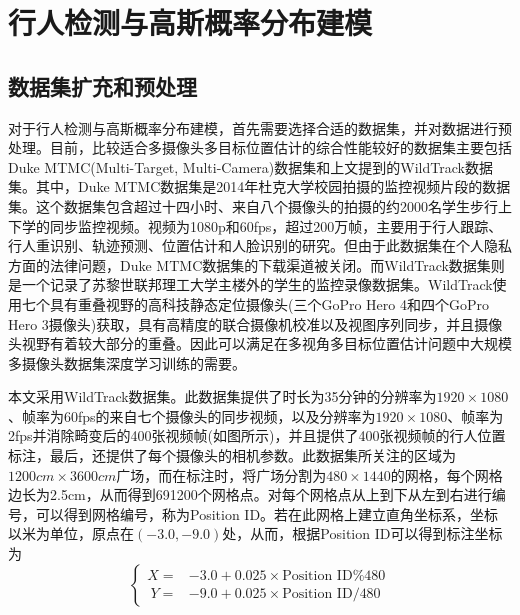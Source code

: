 
\chapter{行人检测与高斯概率分布建模}

\section{数据集扩充和预处理}

对于行人检测与高斯概率分布建模，首先需要选择合适的数据集，并对数据进行预处理。目前，比较适合多摄像头多目标位置估计的综合性能较好的数据集主要包括Duke MTMC(Multi-Target, Multi-Camera)数据集\cite{Ristani2016PerformanceMA}和上文提到的WildTrack数据集。其中，Duke MTMC数据集是2014年杜克大学校园拍摄的监控视频片段的数据集。这个数据集包含超过十四小时、来自八个摄像头的拍摄的约2000名学生步行上下学的同步监控视频。视频为1080p和60fps，超过200万帧，主要用于行人跟踪、行人重识别、轨迹预测、位置估计和人脸识别的研究。但由于此数据集在个人隐私方面的法律问题，Duke MTMC数据集的下载渠道被关闭。而WildTrack数据集则是一个记录了苏黎世联邦理工大学主楼外的学生的监控录像数据集。WildTrack使用七个具有重叠视野的高科技静态定位摄像头(三个GoPro Hero 4和四个GoPro Hero 3摄像头)获取，具有高精度的联合摄像机校准以及视图序列同步，并且摄像头视野有着较大部分的重叠。因此可以满足在多视角多目标位置估计问题中大规模多摄像头数据集深度学习训练的需要。

本文采用WildTrack数据集。此数据集提供了时长为35分钟的分辨率为$1920\times1080$、帧率为60fps的来自七个摄像头的同步视频，以及分辨率为$1920\times1080$、帧率为2fps并消除畸变后的400张视频帧(如图所示)，并且提供了400张视频帧的行人位置标注，最后，还提供了每个摄像头的相机参数。此数据集所关注的区域为$1200cm\times3600cm$广场，而在标注时，将广场分割为$480\times1440$的网格，每个网格边长为2.5cm，从而得到691200个网格点。对每个网格点从上到下从左到右进行编号，可以得到网格编号，称为Position ID。若在此网格上建立直角坐标系，坐标以米为单位，原点在$(-3.0, -9.0)$处，从而，根据Position ID可以得到标注坐标为
\begin{equation}
  \left\{
    \begin{aligned}
    X = & -3.0 + 0.025 \times \text{Position ID} \% 480 \\\
    Y = & -9.0 + 0.025 \times \text{Position ID} / 480
    \end{aligned}
  \right.
\end{equation}


